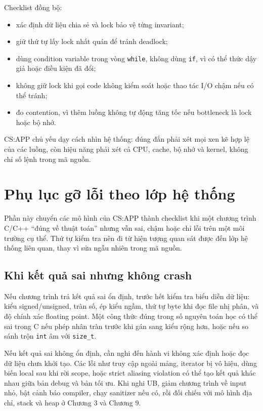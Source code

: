 \documentclass[11pt]{article}
\begin{document}
Checklist đồng bộ:
\begin{itemize}
  \item xác định dữ liệu chia sẻ và lock bảo vệ từng invariant;
  \item giữ thứ tự lấy lock nhất quán để tránh deadlock;
  \item dùng condition variable trong vòng \texttt{while}, không dùng
        \texttt{if}, vì có thể thức dậy giả hoặc điều kiện đã đổi;
  \item không giữ lock khi gọi code không kiểm soát hoặc thao tác I/O chậm nếu
        có thể tránh;
  \item đo contention, vì thêm luồng không tự động tăng tốc nếu bottleneck là
        lock hoặc bộ nhớ.
\end{itemize}

CS:APP chủ yếu dạy cách nhìn hệ thống: đúng đắn phải xét mọi xen kẽ hợp lệ của
các luồng, còn hiệu năng phải xét cả CPU, cache, bộ nhớ và kernel, không chỉ số
lệnh trong mã nguồn.

\section{Phụ lục gỡ lỗi theo lớp hệ thống}

Phần này chuyển các mô hình của CS:APP thành checklist khi một chương trình C/C++
``đúng về thuật toán'' nhưng vẫn sai, chậm hoặc chỉ lỗi trên một môi trường cụ
thể. Thứ tự kiểm tra nên đi từ hiện tượng quan sát được đến lớp hệ thống liên
quan, thay vì sửa ngẫu nhiên trong mã nguồn.

\subsection{Khi kết quả sai nhưng không crash}

Nếu chương trình trả kết quả sai ổn định, trước hết kiểm tra biểu diễn dữ liệu:
kiểu signed/unsigned, tràn số, ép kiểu ngầm, thứ tự byte khi đọc file nhị phân,
và độ chính xác floating point. Một công thức đúng trong số nguyên toán học có
thể sai trong C nếu phép nhân tràn trước khi gán sang kiểu rộng hơn, hoặc nếu
so sánh trộn \texttt{int} âm với \texttt{size\_t}.

Nếu kết quả sai không ổn định, cần nghi đến hành vi không xác định hoặc đọc dữ
liệu chưa khởi tạo. Các lỗi như truy cập ngoài mảng, iterator bị vô hiệu, dùng
biến local sau khi rời scope, hoặc strict aliasing violation có thể tạo kết quả
khác nhau giữa bản debug và bản tối ưu. Khi nghi UB, giảm chương trình về input
nhỏ, bật cảnh báo compiler, chạy sanitizer nếu có, rồi đối chiếu với mô hình
địa chỉ, stack và heap ở Chương 3 và Chương 9.
\end{document}
